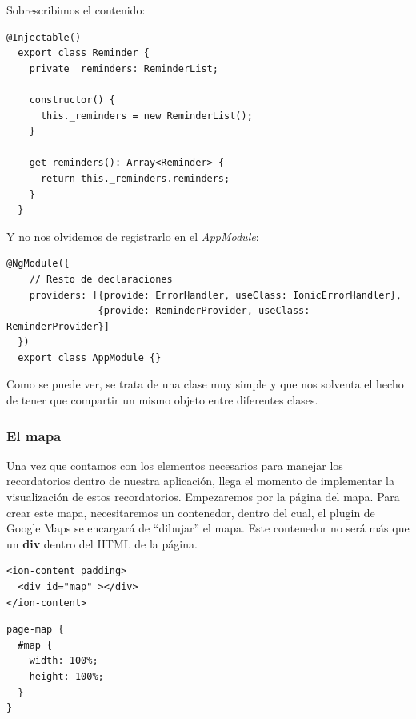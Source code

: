 Sobrescribimos el contenido:

\begin{lstlisting}[style=htmlcssjs,frame=tlrb,xleftmargin={0.2cm}]
  @Injectable()
  export class Reminder {
    private _reminders: ReminderList;

    constructor() {
      this._reminders = new ReminderList();
    }

    get reminders(): Array<Reminder> {
      return this._reminders.reminders;
    }
  }
\end{lstlisting}

Y no nos olvidemos de registrarlo en el \emph{AppModule}:

\begin{lstlisting}[style=htmlcssjs,frame=tlrb,xleftmargin={0.2cm}]
  @NgModule({
    // Resto de declaraciones
    providers: [{provide: ErrorHandler, useClass: IonicErrorHandler},
                {provide: ReminderProvider, useClass: ReminderProvider}]
  })
  export class AppModule {}
\end{lstlisting}

Como se puede ver, se trata de una clase muy simple y que nos solventa el hecho de tener que compartir un mismo objeto entre diferentes clases.

\subsubsection{El mapa}

Una vez que contamos con los elementos necesarios para manejar los recordatorios dentro de nuestra aplicación, llega el momento de implementar la visualización de estos recordatorios. Empezaremos por la página del mapa. Para crear este mapa, necesitaremos un contenedor, dentro del cual, el plugin de Google Maps se encargará de ``dibujar'' el mapa. Este contenedor no será más que un \textbf{div} dentro del \gls{HTML} de la página.

\noindent
\begin{minipage}[t]{.48\textwidth}
{\begin{lstlisting}[style=htmlcssjs,frame=tlrb,xleftmargin={0.2cm}]
<ion-content padding>
  <div id="map" ></div>
</ion-content>
\end{lstlisting}}
\end{minipage}\hfill
\noindent
\begin{minipage}[t]{.48\textwidth}
{\begin{lstlisting}[style=htmlcssjs,frame=tlrb,xleftmargin={0.2cm}]
page-map {
  #map {
    width: 100%;
    height: 100%;
  }
}
\end{lstlisting}}
\end{minipage}

